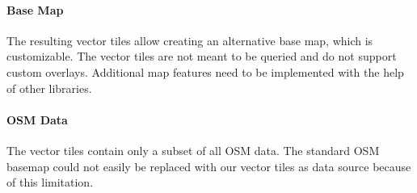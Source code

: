 \paragraph{Base Map} The resulting vector tiles allow creating an alternative base map, which is customizable. The vector tiles are not meant to be queried and do not support custom overlays. Additional map features need to be implemented with the help of other libraries.

\paragraph{OSM Data} The vector tiles contain only a subset of all OSM data. The standard OSM basemap could not easily be replaced with our vector tiles as data source because of this limitation.